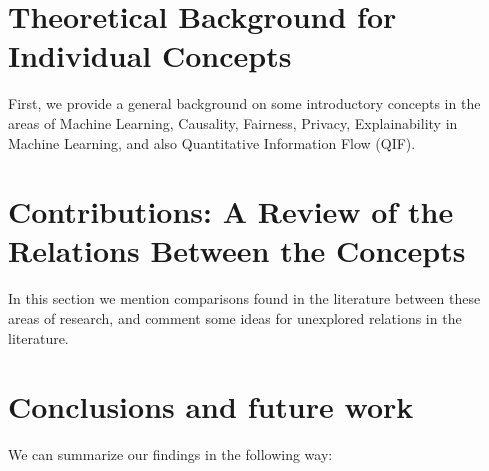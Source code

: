 \documentclass{article}
\begin{document}
\section{Theoretical Background for Individual Concepts}\label{sec:theoRef1}

First, we provide a general background on some introductory concepts in the areas of Machine Learning, Causality, Fairness, Privacy, Explainability in Machine Learning, and also Quantitative Information Flow (QIF).



\section{Contributions: A Review of the Relations Between the Concepts}\label{sec:theoRef2}

In this section we mention comparisons found in the literature between these areas of research, and comment some ideas for unexplored relations in the literature.



\section{Conclusions and future work}\label{sec:concsFuture}

We can summarize our findings in the following way:
\end{document}
